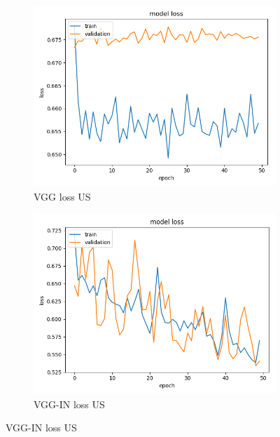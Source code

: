 \begin{figure}[h]
\begin{subfigure}[b]{.24\linewidth}
\includegraphics[width=\linewidth]{Figs/vgg_us_loss.jpg}
\caption{VGG loss US}
\end{subfigure}
\begin{subfigure}[b]{.24\linewidth}
\includegraphics[width=\linewidth]{Figs/vgg_in_us_loss.jpg}
\caption{VGG-IN loss US}
\end{subfigure}


\end{figure}
